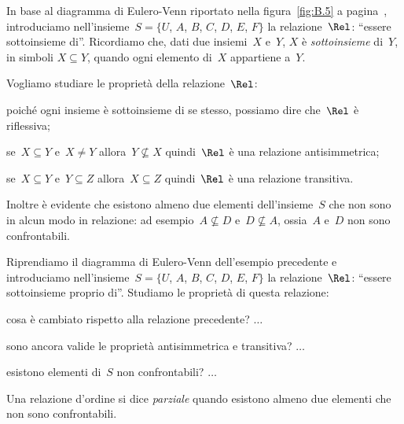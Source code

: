 \begin{exrig}
 \begin{esempio}

In base al diagramma di Eulero-Venn riportato nella figura~\ref{fig:B.5} a pagina~\pageref{fig:B.5}, introduciamo nell'insieme~$S = \{U$, $A$, $B$, $C$, $D$, $E$, $F\}$ la relazione~$\Rel$: ``essere sottoinsieme di''.
Ricordiamo che, dati due insiemi~$X$ e~$Y$, $X$ è \emph{sottoinsieme} di~$Y$, in simboli $X \subseteq Y$, quando ogni elemento di~$X$ appartiene a~$Y$.

Vogliamo studiare le proprietà della relazione~$\Rel$:

\begin{enumeratea}
\item poiché ogni insieme è sottoinsieme di se stesso, possiamo dire che~$\Rel$ è riflessiva;
\item se~$X \subseteq Y$ e~$X \neq Y$ allora~$Y \not\subseteq X$ quindi~$\Rel$ è una relazione antisimmetrica;
\item se~$X \subseteq Y$ e~$Y \subseteq Z$ allora~$X \subseteq Z$ quindi~$\Rel$ è una relazione transitiva.
\end{enumeratea}

Inoltre è evidente che esistono almeno due elementi dell'insieme~$S$ che non sono in
alcun modo in relazione: ad esempio~$A \not\subseteq D$ e~$D \not\subseteq A$, ossia~$A$ e~$D$ non sono confrontabili.

 \end{esempio}

 \begin{esempio}

Riprendiamo il diagramma di Eulero-Venn dell'esempio precedente e introduciamo nell'insieme~$S = \{U$, $A$, $B$, $C$, $D$, $E$, $F\}$ la relazione~$\Rel$:
``essere sottoinsieme proprio di''. Studiamo le proprietà di questa relazione:
\begin{itemize*}
 \item cosa è cambiato rispetto alla relazione precedente? $\ldots$
 \item sono ancora valide le proprietà antisimmetrica e transitiva? $\ldots$
 \item esistono elementi di~$S$ non confrontabili? $\ldots$
\end{itemize*}

 \end{esempio}
\end{exrig}

\begin{definizione}
Una relazione d'ordine si dice \emph{parziale} quando esistono almeno due elementi che non sono confrontabili.
\end{definizione}

